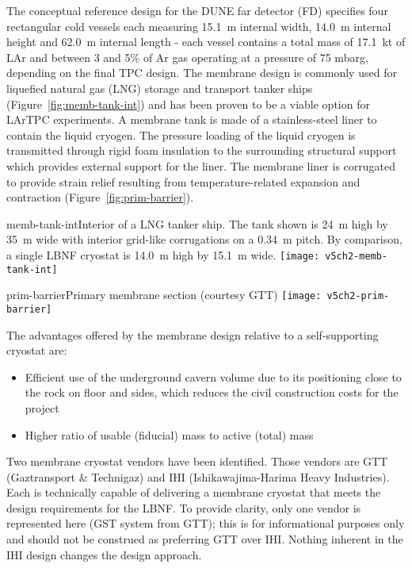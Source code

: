 The conceptual reference design for the DUNE far detector (FD) specifies four  
rectangular cold vessels each measuring 15.1~m internal width, 14.0~m internal 
height and 62.0~m internal length - each vessel contains a total mass of 
17.1~kt of LAr and between 3 and 5\% of Ar gas operating at a 
pressure of 75 mbarg, depending on the final TPC design. The 
membrane design is commonly 
used for liquefied natural gas (LNG) storage and transport 
tanker ships (Figure~\ref{fig:memb-tank-int}) and has been 
proven to be a viable option for LArTPC experiments. 
A membrane tank 
is made of a stainless-steel liner to contain the liquid cryogen. 
The pressure loading of the liquid cryogen is transmitted 
through rigid foam insulation to the surrounding structural support 
which provides external support for the liner. The membrane 
liner is corrugated to provide strain relief resulting from 
temperature-related expansion and contraction (Figure~\ref{fig:prim-barrier}).


\begin{cdrfigure}{memb-tank-int}{Interior of a LNG tanker ship. 
The tank shown is 24~m high by 35~m wide with interior grid-like 
corrugations on a 0.34~m pitch. By comparison, a single LBNF 
cryostat is 14.0~m high by 15.1~m wide.}
\texttt{[image: v5ch2-memb-tank-int]}
\end{cdrfigure}

\begin{cdrfigure}{prim-barrier}{Primary membrane section (courtesy GTT)}
\texttt{[image: v5ch2-prim-barrier]}
\end{cdrfigure}


The advantages offered by the membrane design relative to a self-supporting cryostat are:
\begin{itemize}
\item Efficient use of the underground cavern volume due to its positioning 
close to the rock on floor and sides, which reduces the civil construction 
costs for the project
\item Higher ratio of usable (fiducial) mass to active (total) mass
\end{itemize}

Two membrane cryostat vendors have been 
identified. Those vendors are GTT (Gaztransport \& Technigaz) and 
IHI (Ishikawajima-Harima Heavy Industries). Each is technically capable 
of delivering a membrane cryostat that meets the design requirements for 
the LBNF. To provide clarity, only one vendor is represented here (GST 
system from GTT); this is for informational purposes only and should not 
be construed as preferring GTT over IHI. Nothing inherent in the IHI 
design changes the design approach. 


